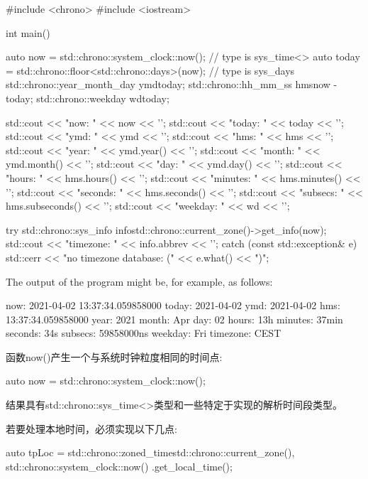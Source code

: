 \begin{cpp}
#include <chrono>
#include <iostream>

int main()
{
	auto now = std::chrono::system_clock::now(); // type is sys_time<>
	auto today = std::chrono::floor<std::chrono::days>(now); // type is sys_days
	std::chrono::year_month_day ymd{today};
	std::chrono::hh_mm_ss hms{now - today};
	std::chrono::weekday wd{today};
	
	std::cout << "now: " << now << '\n';
	std::cout << "today: " << today << '\n';
	std::cout << "ymd: " << ymd << '\n';
	std::cout << "hms: " << hms << '\n';
	std::cout << "year: " << ymd.year() << '\n';
	std::cout << "month: " << ymd.month() << '\n';
	std::cout << "day: " << ymd.day() << '\n';
	std::cout << "hours: " << hms.hours() << '\n';
	std::cout << "minutes: " << hms.minutes() << '\n';
	std::cout << "seconds: " << hms.seconds() << '\n';
	std::cout << "subsecs: " << hms.subseconds() << '\n';
	std::cout << "weekday: " << wd << '\n';
	
	try {
		std::chrono::sys_info info{std::chrono::current_zone()->get_info(now)};
		std::cout << "timezone: " << info.abbrev << '\n';
	}
	catch (const std::exception& e) {
		std::cerr << "no timezone database: (" << e.what() << ")\n";
	}
}
\end{cpp}

The output of the program might be, for example, as follows:

\begin{shell}
now:      2021-04-02 13:37:34.059858000
today:    2021-04-02
ymd:      2021-04-02
hms:      13:37:34.059858000
year:     2021
month:    Apr
day:      02
hours:    13h
minutes:  37min
seconds:  34s
subsecs:  59858000ns
weekday:  Fri
timezone: CEST
\end{shell}

函数now()产生一个与系统时钟粒度相同的时间点:

\begin{cpp}
auto now = std::chrono::system_clock::now();
\end{cpp}

结果具有std::chrono::sys\_time<>类型和一些特定于实现的解析时间段类型。

若要处理本地时间，必须实现以下几点:

\begin{cpp}
auto tpLoc = std::chrono::zoned_time{std::chrono::current_zone(),
										std::chrono::system_clock::now()
									}.get_local_time();
\end{cpp}

